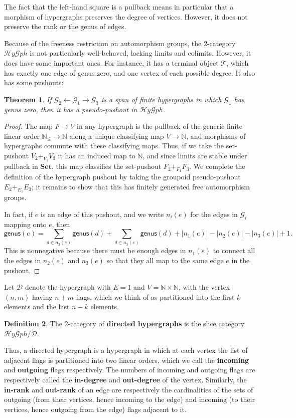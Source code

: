 \documentclass{article}
\newtheorem{thm}{Theorem}[section]
\theoremstyle{definition}
\newtheorem{defn}[thm]{Definition}
\theoremstyle{remark}
\def\G{\mathcal{G}}
\def\Set{\mathbf{Set}}
\let\ot\leftarrow
\def\genus{\mathsf{genus}}
\def\N{\mathbb{N}}
\def\hy{\mathcal{H}\mathit{y}\mathcal{G}\mathit{ph}}
\def\thy{\mathcal{T}}
\def\dhy{\mathcal{D}}
\begin{document}
The fact that the left-hand square is a pullback means in particular that a morphism of hypergraphs preserves the degree of vertices.
However, it does not preserve the rank or the genus of edges.

Because of the freeness restriction on automorphism groups, the 2-category $\hy$ is not particularly well-behaved, lacking limits and colimits.
However, it does have some important ones.
For instance, it has a terminal object $\thy$, which has exactly one edge of genus zero, and one vertex of each possible degree.
It also has some pushouts:

\begin{thm}\label{thm:pushout}
  If $\G_2 \ot \G_1 \to \G_3$ is a span of finite hypergraphs in which $\G_1$ has genus zero, then it has a pseudo-pushout in $\hy$.
\end{thm}
\begin{proof}
  The map $F\to V$ in any hypergraph is the pullback of the generic finite linear order $\N_\le \to \N$ along a unique classifying map $V\to\N$, and morphisms of hypergraphs commute with these classifying maps.
  Thus, if we take the set-pushout $V_2 +_{V_1} V_3$ it has an induced map to $\N$, and since limits are stable under pullback in $\Set$, this map classifies the set-pushout $F_2 +_{F_1} F_3$.
  We complete the definition of the hypergraph pushout by taking the groupoid pseudo-pushout $E_2 +_{E_1} E_3$; it remains to show that this has finitely generated free automorphism groups.

  In fact, if $e$ is an edge of this pushout, and we write $n_i(e)$ for the edges in $\G_i$ mapping onto $e$, then
  \[ \genus(e) = \sum_{d\in n_2(e)} \genus(d) + \sum_{d\in n_3(e)} \genus(d) + |n_1(e)| - |n_2(e)| - |n_3(e)| + 1. \]
  This is nonnegative because there must be enough edges in $n_1(e)$ to connect all the edges in $n_2(e)$ and $n_3(e)$ so that they all map to the same edge $e$ in the pushout.
\end{proof}

Let $\dhy$ denote the hypergraph with $E=1$ and $V=\N\times \N$, with the vertex $(n,m)$ having $n+m$ flags, which we think of as partitioned into the first $k$ elements and the last $n-k$ elements.

\begin{defn}
  The 2-category of \textbf{directed hypergraphs} is the slice category $\hy/\dhy$.
\end{defn}

Thus, a directed hypergraph is a hypergraph in which at each vertex the list of adjacent flags is partitioned into two linear orders, which we call the \textbf{incoming} and \textbf{outgoing} flags respectively.
The numbers of incoming and outgoing flags are respectively called the \textbf{in-degree} and \textbf{out-degree} of the vertex.
Similarly, the \textbf{in-rank} and \textbf{out-rank} of an edge are respectively the cardinalities of the sets of outgoing (from their vertices, hence incoming to the edge) and incoming (to their vertices, hence outgoing from the edge) flags adjacent to it.
\end{document}
